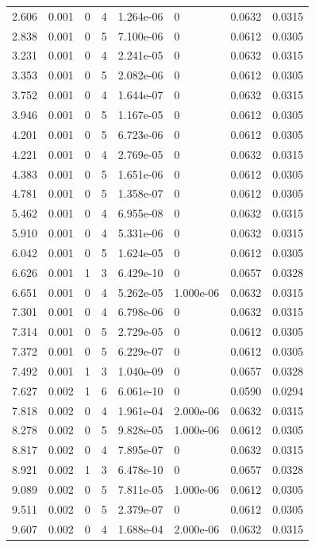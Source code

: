 \documentclass[preview]{standalone}
\begin{document}
{{\begin{tabular}{L{1.2cm}C{1.2cm} C{0.3cm}C{0.5cm} C{1.4cm}C{1.4cm} C{1.4cm}C{1.4cm}}
  2.606  &  0.001  & 0     &  4 &  1.264e-06  & 0  & 0.0632 &  0.0315   \\ 
  2.838  &  0.001  & 0     &  5 &  7.100e-06  & 0  & 0.0612 &  0.0305   \\ 
  3.231  &  0.001  & 0     &  4 &  2.241e-05  & 0  & 0.0632 &  0.0315   \\ 
  3.353  &  0.001  & 0     &  5 &  2.082e-06  & 0  & 0.0612 &  0.0305   \\ 
  3.752  &  0.001  & 0     &  4 &  1.644e-07  & 0  & 0.0632 &  0.0315   \\ 
  3.946  &  0.001  & 0     &  5 &  1.167e-05  & 0  & 0.0612 &  0.0305   \\ 
  4.201  &  0.001  & 0     &  5 &  6.723e-06  & 0  & 0.0612 &  0.0305   \\ 
  4.221  &  0.001  & 0     &  4 &  2.769e-05  & 0  & 0.0632 &  0.0315   \\ 
  4.383  &  0.001  & 0     &  5 &  1.651e-06  & 0  & 0.0612 &  0.0305   \\ 
  4.781  &  0.001  & 0     &  5 &  1.358e-07  & 0  & 0.0612 &  0.0305   \\ 
  5.462  &  0.001  & 0     &  4 &  6.955e-08  & 0  & 0.0632 &  0.0315   \\ 
  5.910  &  0.001  & 0     &  4 &  5.331e-06  & 0  & 0.0632 &  0.0315   \\ 
  6.042  &  0.001  & 0     &  5 &  1.624e-05  & 0  & 0.0612 &  0.0305   \\ 
  6.626  &  0.001  & 1     &  3 &  6.429e-10  & 0  & 0.0657 &  0.0328   \\ 
  6.651  &  0.001  & 0     &  4 &  5.262e-05  & 1.000e-06  & 0.0632 &  0.0315   \\ 
  7.301  &  0.001  & 0     &  4 &  6.798e-06  & 0  & 0.0632 &  0.0315   \\ 
  7.314  &  0.001  & 0     &  5 &  2.729e-05  & 0  & 0.0612 &  0.0305   \\ 
  7.372  &  0.001  & 0     &  5 &  6.229e-07  & 0  & 0.0612 &  0.0305   \\ 
  7.492  &  0.001  & 1     &  3 &  1.040e-09  & 0  & 0.0657 &  0.0328   \\ 
  7.627  &  0.002  & 1     &  6 &  6.061e-10  & 0  & 0.0590 &  0.0294   \\ 
  7.818  &  0.002  & 0     &  4 &  1.961e-04  & 2.000e-06  & 0.0632 &  0.0315   \\ 
  8.278  &  0.002  & 0     &  5 &  9.828e-05  & 1.000e-06  & 0.0612 &  0.0305   \\ 
  8.817  &  0.002  & 0     &  4 &  7.895e-07  & 0  & 0.0632 &  0.0315   \\ 
  8.921  &  0.002  & 1     &  3 &  6.478e-10  & 0  & 0.0657 &  0.0328   \\ 
  9.089  &  0.002  & 0     &  5 &  7.811e-05  & 1.000e-06  & 0.0612 &  0.0305   \\ 
  9.511  &  0.002  & 0     &  5 &  2.379e-07  & 0  & 0.0612 &  0.0305   \\ 
  9.607  &  0.002  & 0     &  4 &  1.688e-04  & 2.000e-06  & 0.0632 &  0.0315   \\ 
\hline 
\end{tabular} 

}}
\end{document}
